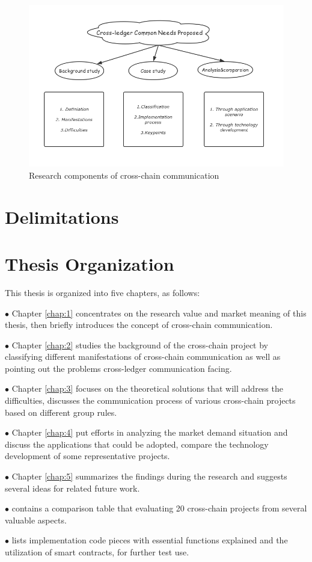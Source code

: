     
    \begin{figure}[H]
    \includegraphics[width=1\textwidth]{./figures/contri.png}
    \centering
    \caption{Research components of cross-chain communication}%
    \centering
    \label{fig:contri}
    \end{figure}

\section{Delimitations}

\section{Thesis Organization}

This thesis is organized into five chapters, as follows:

$\bullet $ Chapter \ref{chap:1} concentrates on the research value and market meaning of this thesis, then briefly introduces the concept of cross-chain communication.

$\bullet $ Chapter \ref{chap:2} studies the background of the cross-chain project by classifying different manifestations of cross-chain communication as well as pointing out the problems cross-ledger communication facing.

$\bullet $ Chapter \ref{chap:3} focuses on the theoretical solutions that will address the difficulties, discusses the communication process of various cross-chain projects based on different group rules. 

$\bullet $ Chapter \ref{chap:4} put efforts in analyzing the market demand situation and discuss the applications that could be adopted, compare the technology development of some representative projects.

$\bullet $ Chapter \ref{chap:5} summarizes the findings during the research and suggests several ideas for related future work.

$\bullet $  contains a comparison table that evaluating 20 cross-chain projects from several valuable aspects.

$\bullet $  lists implementation code pieces with essential functions explained and the utilization of smart contracts, for further test use.
  